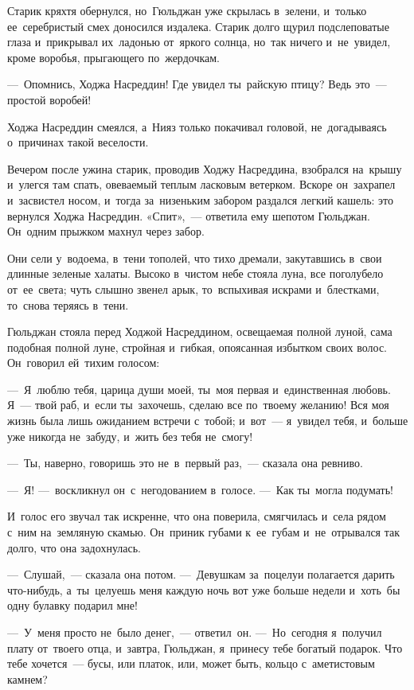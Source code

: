 \documentclass[12pt,a4paper]{book}
\begin{document}
Старик кряхтя обернулся, но~Гюльджан уже скрылась в~зелени, и~только ее~серебристый смех доносился издалека. Старик долго щурил подслеповатые глаза и~прикрывал их~ладонью от~яркого солнца, но~так ничего и~не~увидел, кроме воробья, прыгающего по~жердочкам.

—~Опомнись, Ходжа Насреддин! Где увидел ты~райскую птицу? Ведь это~— простой воробей!

Ходжа Насреддин смеялся, а~Нияз только покачивал головой, не~догадываясь о~причинах такой веселости.

Вечером после ужина старик, проводив Ходжу Насреддина, взобрался на~крышу и~улегся там спать, овеваемый теплым ласковым ветерком. Вскоре он~захрапел и~засвистел носом, и~тогда за~низеньким забором раздался легкий кашель: это вернулся Ходжа Насреддин. «Спит»,~— ответила ему шепотом Гюльджан. Он~одним прыжком махнул через забор.

Они сели у~водоема, в~тени тополей, что тихо дремали, закутавшись в~свои длинные зеленые халаты. Высоко в~чистом небе стояла луна, все поголубело от~ее~света; чуть слышно звенел арык, то~вспыхивая искрами и~блестками, то~снова теряясь в~тени.

Гюльджан стояла перед Ходжой Насреддином, освещаемая полной луной, сама подобная полной луне, стройная и~гибкая, опоясанная избытком своих волос. Он~говорил ей~тихим голосом:

—~Я~люблю тебя, царица души моей, ты~моя первая и~единственная любовь. Я~— твой раб, и~если ты~захочешь, сделаю все по~твоему желанию! Вся моя жизнь была лишь ожиданием встречи с~тобой; и~вот~— я~увидел тебя, и~больше уже никогда не~забуду, и~жить без тебя не~смогу!

—~Ты, наверно, говоришь это не~в~первый раз,~— сказала она ревниво.

—~Я! —~воскликнул он~с~негодованием в~голосе. —~Как ты~могла подумать!

И~голос его звучал так искренне, что она поверила, смягчилась и~села рядом с~ним на~земляную скамью. Он~приник губами к~ее~губам и~не~отрывался так долго, что она задохнулась.

—~Слушай,~— сказала она потом. —~Девушкам за~поцелуи полагается дарить что-нибудь, а~ты~целуешь меня каждую ночь вот уже больше недели и~хоть~бы одну булавку подарил мне!

—~У~меня просто не~было денег,~— ответил~он. —~Но~сегодня я~получил плату от~твоего отца, и~завтра, Гюльджан, я~принесу тебе богатый подарок. Что тебе хочется~— бусы, или платок, или, может быть, кольцо с~аметистовым камнем?
\end{document}
